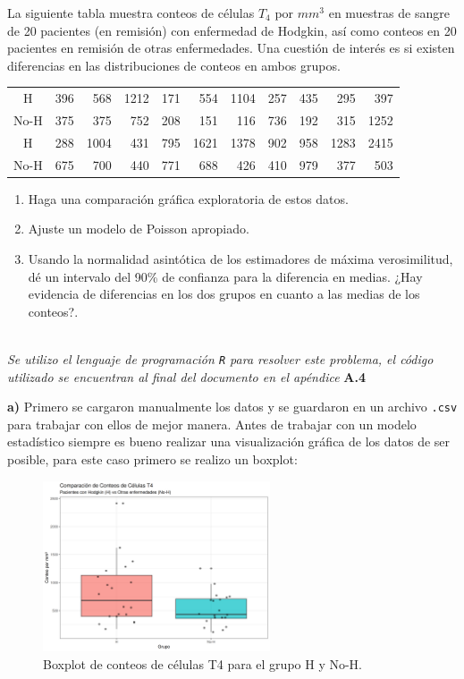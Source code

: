 La siguiente tabla muestra conteos de células $T_4$ por $mm^3$ en muestras de sangre de 20 pacientes (en remisión) con enfermedad de Hodgkin, así como conteos en 20 pacientes en remisión de otras enfermedades. Una cuestión de interés es si existen diferencias en las distribuciones de conteos en ambos grupos.

\begin{center}
\begin{tabular}{|c|rrrrrrrrrr|}
\hline
H    & 396 & 568  & 1212 & 171 & 554  & 1104 & 257 & 435 & 295  & 397  \\
No-H & 375 & 375  & 752  & 208 & 151  & 116  & 736 & 192 & 315  & 1252 \\
H    & 288 & 1004 & 431  & 795 & 1621 & 1378 & 902 & 958 & 1283 & 2415 \\
No-H & 675 & 700  & 440  & 771 & 688  & 426  & 410 & 979 & 377  & 503  \\
\hline
\end{tabular}
\end{center}

\begin{enumerate}[label=\alph*.]
    \item Haga una comparación gráfica exploratoria de estos datos.
    \item Ajuste un modelo de Poisson apropiado.
    \item Usando la normalidad asintótica de los estimadores de máxima verosimilitud, dé un intervalo del 90\% de confianza para la diferencia en medias. ¿Hay evidencia de diferencias en los dos grupos en cuanto a las medias de los conteos?.
\end{enumerate}

\noindent{}\\

\textit{Se utilizo el lenguaje de programación \texttt{R} para resolver este problema, el código utilizado se encuentran al final del documento en el apéndice} \textbf{A.4}

\textbf{a)} Primero se cargaron manualmente los datos y se guardaron en un archivo \texttt{.csv} para trabajar con ellos de mejor manera. Antes de trabajar con un modelo estadístico siempre es bueno realizar una visualización gráfica de los datos de ser posible, para este caso primero se realizo un boxplot: 

\begin{figure}[H]
    \centering
    \includegraphics[width=0.6\textwidth]{images/boxplot_comparativo.png}
    \caption{Boxplot de conteos de células T4 para el grupo H y No-H.}
    \label{fig:1}
\end{figure}


